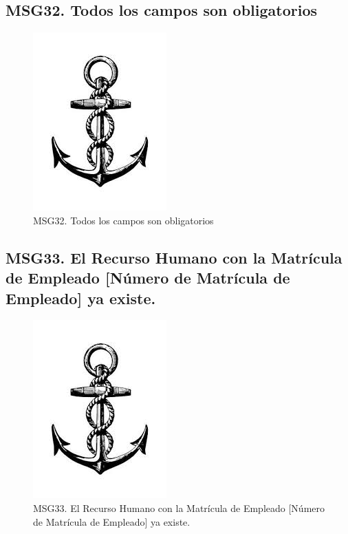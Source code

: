     \subsection{MSG32. Todos los campos son obligatorios}
        \begin{figure}[htbp]
            \begin{center}
                \includegraphics[width=.4\textwidth]{images/MSG/ancla}
                \caption{MSG32. Todos los campos son obligatorios}
                \label{fig:MSG32}
            \end{center}
        \end{figure}


    \subsection{MSG33. El Recurso Humano con la Matrícula de Empleado [Número de Matrícula de Empleado] ya existe.}
        \begin{figure}[htbp]
            \begin{center}
                \includegraphics[width=.4\textwidth]{images/MSG/ancla}
                \caption{MSG33. El Recurso Humano con la Matrícula de Empleado [Número de Matrícula de Empleado] ya existe.}
                \label{fig:MSG33}
            \end{center}
        \end{figure}


